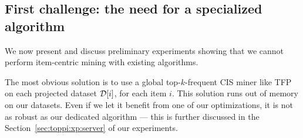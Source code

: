 \subsection{First challenge: the need for a specialized algorithm}
\label{sec:toppi:jclmCoverage}


We now present and discuss
preliminary experiments showing that we cannot perform item-centric mining with existing algorithms.

The most obvious solution is to use a global top-$k$-frequent CIS miner like TFP~\cite{HanICDM02}
on each projected dataset ${\cal D}[i]$, for each item $i$.
This solution runs out of memory on our datasets.
Even if we let it benefit from one of our optimizations,
it is not as robust as our dedicated algorithm --- this is further discussed in the Section~\ref{sec:toppi:xp:server} of our experiments.


